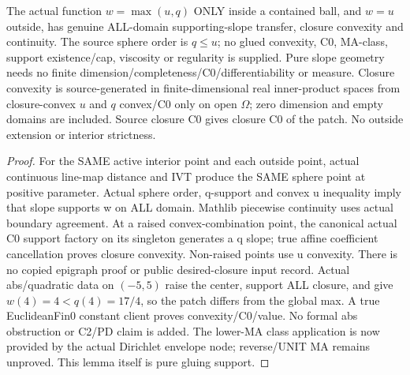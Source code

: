 \begin{lemma}
  \label{lem:convex-local-max-gluing}
  \leanok
  The actual function $w=\max(u,q)$ ONLY inside a contained ball, and $w=u$
  outside, has genuine ALL-domain supporting-slope transfer, closure convexity
  and continuity. The source sphere order is $q\le u$; no glued convexity,
  C0, MA-class, support existence/cap, viscosity or regularity is supplied.
  Pure slope geometry needs no finite dimension/completeness/C0/differentiability
  or measure. Closure convexity is source-generated in finite-dimensional real
  inner-product spaces from closure-convex $u$ and $q$ convex/C0 only on open
  $\Omega$; zero dimension and empty domains are included. Source closure C0
  gives closure C0 of the patch. No outside extension or interior strictness.
\end{lemma}
\begin{proof}
  \leanok
  For the SAME active interior point and each outside point, actual continuous
  line-map distance and IVT produce the SAME sphere point at positive parameter.
  Actual sphere order, q-support and convex u inequality imply that slope
  supports w on ALL domain. Mathlib piecewise continuity uses actual boundary
  agreement. At a raised convex-combination point, the canonical actual C0
  support factory on its singleton generates a q slope; true affine coefficient
  cancellation proves closure convexity. Non-raised points use u convexity.
  There is no copied epigraph proof or public desired-closure input record.
  Actual abs/quadratic data on $(-5,5)$ raise the center, support ALL closure,
  and give $w(4)=4<q(4)=17/4$, so the patch differs from the global max.
  A true EuclideanFin0 constant client proves convexity/C0/value. No formal
  abs obstruction or C2/PD claim is added. The lower-MA class application is now provided by the actual Dirichlet
  envelope node; reverse/UNIT MA remains unproved. This lemma itself is pure gluing support.
\end{proof}

